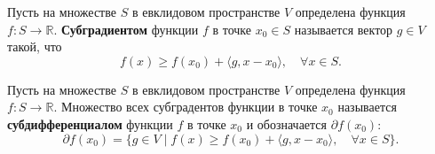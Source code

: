 \begin{definition}
    Пусть на множестве $S$ в евклидовом пространстве $V$ определена функция $f : S \to \mathbb{R}$. 
    \textbf{Субградиентом} функции $f$ в точке $x_0 \in S$ называется вектор $g \in V$ такой, что
    $$f(x) \geq f(x_0) + \langle g, x - x_0 \rangle, \quad \forall x \in S.$$
\end{definition}

\begin{definition}
    Пусть на множестве $S$ в евклидовом пространстве $V$ определена функция $f : S \to \mathbb{R}$. 
    Множество всех субградентов функции в точке $x_0$ называется \textbf{субдифференциалом} функции $f$ в точке $x_0$ и 
    обозначается $\partial f(x_0)$:
$$\partial f(x_0) = \{ g \in V \mid f(x) \geq f(x_0) + \langle g, x - x_0 \rangle, \quad \forall x \in S \}.$$
\end{definition}
